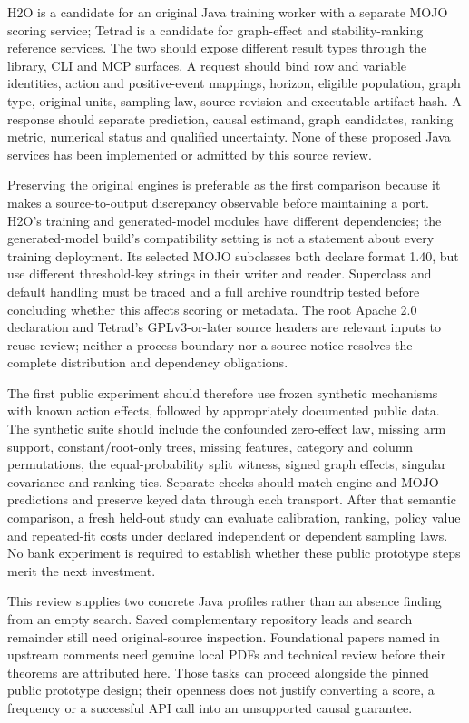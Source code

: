 H2O is a candidate for an original Java training worker with a separate MOJO
scoring service; Tetrad is a candidate for graph-effect and stability-ranking
reference services. The two should expose different result types through the
library, CLI and MCP surfaces. A request should bind row and variable identities,
action and positive-event mappings, horizon, eligible population, graph type,
original units, sampling law, source revision and executable artifact hash.
A response should separate prediction, causal estimand, graph candidates,
ranking metric, numerical status and qualified uncertainty. None of these
proposed Java services has been implemented or admitted by this source review.
\citep{exec20_javaeffects_h2o,exec20_javaeffects_tetrad}

Preserving the original engines is preferable as the first comparison because
it makes a source-to-output discrepancy observable before maintaining a port.
H2O's training and generated-model modules have different dependencies; the
generated-model build's compatibility setting is not a statement about every
training deployment. Its selected MOJO subclasses both declare format 1.40,
but use different threshold-key strings in their writer and reader. Superclass
and default handling must be traced and a full archive roundtrip tested before
concluding whether this affects scoring or metadata. The root Apache 2.0
declaration and Tetrad's GPLv3-or-later source headers are relevant inputs to
reuse review; neither a process boundary nor a source notice resolves the
complete distribution and dependency obligations.
\citep{exec20_javaeffects_h2o,exec20_javaeffects_tetrad}

The first public experiment should therefore use frozen synthetic mechanisms
with known action effects, followed by appropriately documented public data.
The synthetic suite should include the confounded zero-effect law, missing arm
support, constant/root-only trees, missing features, category and column
permutations, the equal-probability split witness, signed graph effects,
singular covariance and ranking ties. Separate checks should match engine and
MOJO predictions and preserve keyed data through each transport. After that
semantic comparison, a fresh held-out study can evaluate calibration, ranking,
policy value and repeated-fit costs under declared independent or dependent
sampling laws. No bank experiment is required to establish whether these
public prototype steps merit the next investment.
\citep{exec20_javaeffects_reference}

This review supplies two concrete Java profiles rather than an absence finding
from an empty search. Saved complementary repository leads and search remainder
still need original-source inspection. Foundational papers named in upstream
comments need genuine local PDFs and technical review before their theorems
are attributed here. Those tasks can proceed alongside the pinned public
prototype design; their openness does not justify converting a score, a
frequency or a successful API call into an unsupported causal guarantee.
\citep{exec20_javaeffects_h2o,exec20_javaeffects_tetrad}


